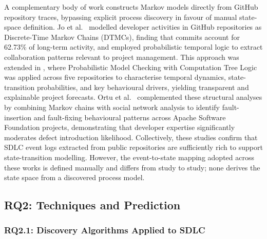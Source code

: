 A complementary body of work constructs Markov models directly from GitHub
repository traces, bypassing explicit process discovery in favour of manual
state-space definition. Jo et al.\ \cite{jo2023} modelled developer activities
in GitHub repositories as Discrete-Time Markov Chains (DTMCs), finding that
commits account for 62.73\% of long-term activity, and employed probabilistic
temporal logic to extract collaboration patterns relevant to project management.
This approach was extended in \cite{jo2024}, where Probabilistic Model Checking
with Computation Tree Logic was applied across five repositories to characterise
temporal dynamics, state-transition probabilities, and key behavioural drivers,
yielding transparent and explainable project forecasts. Ortu et al.\ \cite{ortu2023}
complemented these structural analyses by combining Markov chains with social
network analysis to identify fault-insertion and fault-fixing behavioural patterns
across Apache Software Foundation projects, demonstrating that developer expertise
significantly moderates defect introduction likelihood. Collectively, these studies
confirm that SDLC event logs extracted from public repositories are sufficiently
rich to support state-transition modelling. However, the event-to-state mapping
adopted across these works is defined manually and differs from study to study;
none derives the state space from a discovered process model.


\subsection{RQ2: Techniques and Prediction}
\label{sec:slr-rq2}

\subsubsection{RQ2.1: Discovery Algorithms Applied to SDLC}

